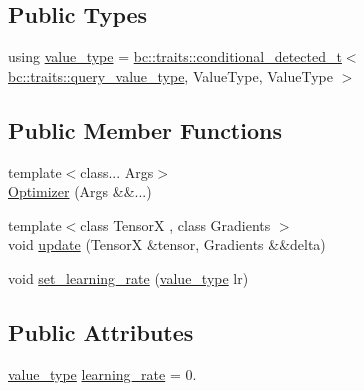 \subsection*{Public Types}
\begin{DoxyCompactItemize}
\item 
using \hyperlink{structbc_1_1nn_1_1Stochastic__Gradient__Descent_1_1Optimizer_a255321a50ffae76f028227a998915bc6}{value\+\_\+type} = \hyperlink{namespacebc_1_1traits_a1a6d378947ec32acd457890854bcd592}{bc\+::traits\+::conditional\+\_\+detected\+\_\+t}$<$ \hyperlink{namespacebc_1_1traits_a40b9437a2ec1bb34ee7d506c8053f906}{bc\+::traits\+::query\+\_\+value\+\_\+type}, Value\+Type, Value\+Type $>$
\end{DoxyCompactItemize}
\subsection*{Public Member Functions}
\begin{DoxyCompactItemize}
\item 
{\footnotesize template$<$class... Args$>$ }\\\hyperlink{structbc_1_1nn_1_1Stochastic__Gradient__Descent_1_1Optimizer_a8476f579e984286acf30835fa63f6909}{Optimizer} (Args \&\&...)
\item 
{\footnotesize template$<$class TensorX , class Gradients $>$ }\\void \hyperlink{structbc_1_1nn_1_1Stochastic__Gradient__Descent_1_1Optimizer_a18dac0703a9fddc5b9edc9f616061fc0}{update} (TensorX \&tensor, Gradients \&\&delta)
\item 
void \hyperlink{structbc_1_1nn_1_1Stochastic__Gradient__Descent_1_1Optimizer_a45fc8904b667c146a202c0a3ed1d5a09}{set\+\_\+learning\+\_\+rate} (\hyperlink{structbc_1_1nn_1_1Stochastic__Gradient__Descent_1_1Optimizer_a255321a50ffae76f028227a998915bc6}{value\+\_\+type} lr)
\end{DoxyCompactItemize}
\subsection*{Public Attributes}
\begin{DoxyCompactItemize}
\item 
\hyperlink{structbc_1_1nn_1_1Stochastic__Gradient__Descent_1_1Optimizer_a255321a50ffae76f028227a998915bc6}{value\+\_\+type} \hyperlink{structbc_1_1nn_1_1Stochastic__Gradient__Descent_1_1Optimizer_a63def0690fc6f712ac037d9354023983}{learning\+\_\+rate} = 0.
\end{DoxyCompactItemize}


